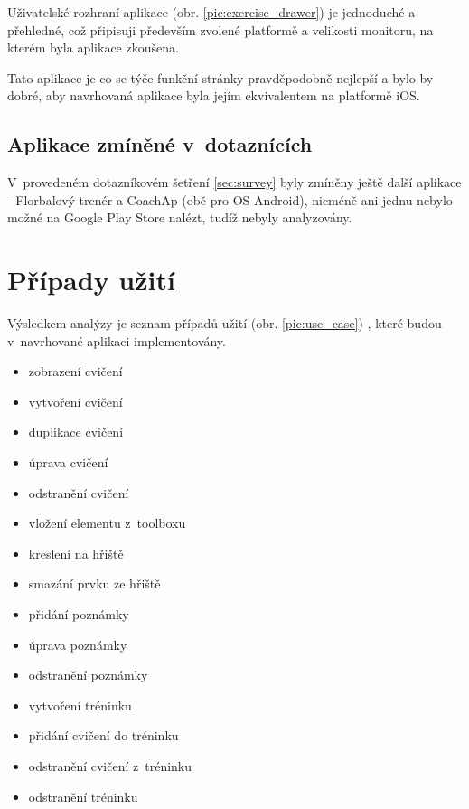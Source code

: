 \documentclass[thesis=B,czech]{FITthesis}[2012/06/26]
\begin{document}
	Uživatelské rozhraní aplikace (obr. \ref{pic:exercise_drawer}) je jednoduché a přehledné, což připisuji především zvolené platformě a velikosti monitoru, na kterém byla aplikace zkoušena.

	Tato aplikace je co se týče funkční stránky pravděpodobně nejlepší a bylo by dobré, aby navrhovaná aplikace byla jejím ekvivalentem na platformě iOS.

	\subsection{Aplikace zmíněné v~dotaznících}

	V~provedeném dotazníkovém šetření \ref{sec:survey} byly zmíněny ještě další aplikace \-- Florbalový trenér a CoachAp (obě pro OS Android), nicméně ani jednu nebylo možné na Google Play Store nalézt, tudíž nebyly analyzovány.

	\section{Případy užití}

	Výsledkem analýzy je seznam případů užití (obr. \ref{pic:use_case}) , které budou v~navrhované aplikaci implementovány.

	\begin{itemize}
		\item zobrazení cvičení
		\item vytvoření cvičení
		\item duplikace cvičení
		\item úprava cvičení
		\item odstranění cvičení

		\item vložení elementu z~toolboxu
		\item kreslení na hřiště
		\item smazání prvku ze hřiště
		\item přidání poznámky
		\item úprava poznámky
		\item odstranění poznámky

		\item vytvoření tréninku
		\item přidání cvičení do tréninku
		\item odstranění cvičení z~tréninku
		\item odstranění tréninku
	\end{itemize}
\end{document}
